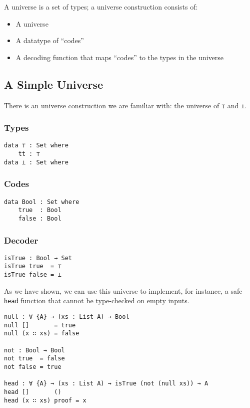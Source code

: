 \documentclass[\main/thesis.tex]{subfiles}
\begin{document}
A universe is a set of types;
a universe construction consists of:

\begin{itemize}
    \item A universe
    \item A datatype of ``codes''
    \item A decoding function that maps ``codes'' to the types in the universe
\end{itemize}

\subsection{A Simple Universe}

There is an universe construction we are familiar with: the universe
of \lstinline|⊤| and \lstinline|⊥|.

\subsubsection{Types}

\begin{lstlisting}
data ⊤ : Set where
    tt : ⊤
data ⊥ : Set where
\end{lstlisting}

\subsubsection{Codes}

\begin{lstlisting}
data Bool : Set where
    true  : Bool
    false : Bool
\end{lstlisting}

\subsubsection{Decoder}

\begin{lstlisting}
isTrue : Bool → Set
isTrue true  = ⊤
isTrue false = ⊥
\end{lstlisting}

As we have shown, we can use this universe to implement, for instance, a safe
\lstinline|head| function that cannot be type-checked on empty inputs.

\begin{lstlisting}
null : ∀ {A} → (xs : List A) → Bool
null []       = true
null (x ∷ xs) = false

not : Bool → Bool
not true  = false
not false = true

head : ∀ {A} → (xs : List A) → isTrue (not (null xs)) → A
head []       ()
head (x ∷ xs) proof = x
\end{lstlisting}
\end{document}
